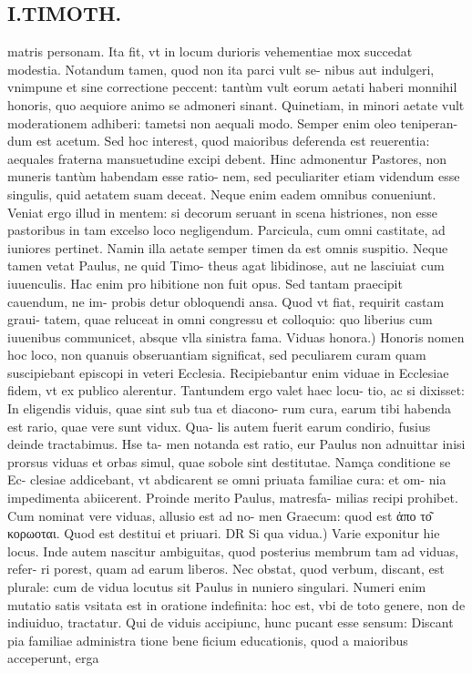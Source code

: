 \documentclass{article}
\begin{document}
\begin{pages}
\section*{I.TIMOTH. }
\marginpar{[ p.56 ]}\pstart matris personam. Ita fit, vt in locum durioris vehementiae mox succedat modestia. Notandum tamen, quod non ita parci vult se- nibus aut indulgeri, vnimpune et sine correctione peccent: tantùm vult eorum aetati haberi monnihil honoris, quo aequiore animo se admoneri sinant. Quinetiam, in minori aetate vult moderationem adhiberi: tametsi non aequali modo. Semper enim oleo teniperan- dum est acetum. Sed hoc interest, quod maioribus deferenda est reuerentia: aequales fraterna mansuetudine excipi debent. Hinc admonentur Pastores, non muneris tantùm habendam esse ratio- nem, sed peculiariter etiam videndum esse singulis, quid aetatem suam deceat. Neque enim eadem omnibus conueniunt. Veniat ergo illud in mentem: si decorum seruant in scena histriones, non esse pastoribus in tam excelso loco negligendum. Parcicula, cum omni castitate, ad iuniores pertinet. Namin illa aetate semper timen da est omnis suspitio. Neque tamen vetat Paulus, ne quid Timo- theus agat libidinose, aut ne lasciuiat cum iuuenculis. Hac enim pro hibitione non fuit opus. Sed tantam praecipit cauendum, ne im- probis detur obloquendi ansa. Quod vt fiat, requirit castam graui- tatem, quae reluceat in omni congressu et colloquio: quo liberius cum iuuenibus communicet, absque vlla sinistra fama.  \pend\pstart Viduas honora.) Honoris nomen hoc loco, non quanuis obseruantiam significat, sed peculiarem curam quam suscipiebant episcopi in veteri Ecclesia. Recipiebantur enim viduae in Ecclesiae fidem, vt ex publico alerentur. Tantundem ergo valet haec locu- tio, ac si dixisset: In eligendis viduis, quae sint sub tua et diacono- rum cura, earum tibi habenda est rario, quae vere sunt vidux. Qua- lis autem fuerit earum condirio, fusius deinde tractabimus. Hse ta- men notanda est ratio, eur Paulus non adnuittar inisi prorsus viduas et orbas simul, quae sobole sint destitutae. Namça conditione se Ec- clesiae addicebant, vt abdicarent se omni priuata familiae cura: et om- nia impedimenta abiicerent. Proinde merito Paulus, matresfa- milias recipi prohibet. Cum nominat vere viduas, allusio est ad no- men Graecum: quod est ἀπο το͂ κορωοται. Quod est destitui et priuari. DR  \pend\pstart Si qua vidua.) Varie exponitur hie locus. Inde autem nascitur ambiguitas, quod posterius membrum tam ad viduas, refer- ri porest, quam ad earum liberos. Nec obstat, quod verbum, discant, est plurale: cum de vidua locutus sit Paulus in nuniero singulari. Numeri enim mutatio satis vsitata est in oratione indefinita: hoc est, vbi de toto genere, non de indiuiduo, tractatur. Qui de viduis accipiunc, hunc pucant esse sensum: Discant pia familiae administra tione bene ficium educationis, quod a maioribus acceperunt, erga  \pend

\end{pages}
\end{document}
